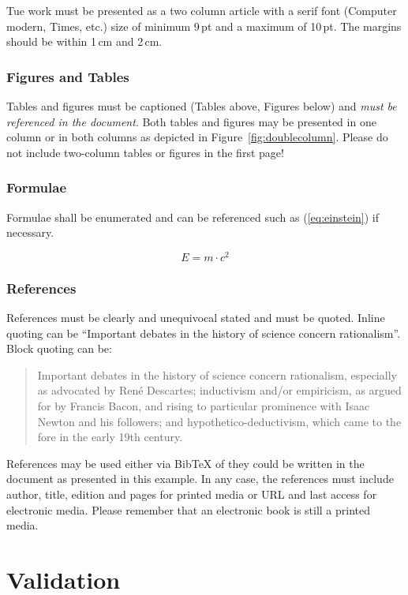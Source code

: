 	Tue work must be presented as a two column article with a serif font (Computer modern, Times, etc.)  size of minimum 9\,pt and a maximum of 10\,pt. The margins should be within 1\,cm and 2\,cm.
	
	\subsubsection{Figures and Tables}
	Tables and figures must be captioned (Tables above, Figures below) and \emph{must be referenced in the document}. Both tables and figures may be presented in one column or in both columns as depicted in Figure~\ref{fig:doublecolumn}. Please do not include two-column tables or figures in the first page!
	

	
	\subsubsection{Formulae}
	Formulae shall be enumerated and can be referenced such as (\ref{eq:einstein}) if necessary.
	
	\begin{equation}
		E=m\cdot c^2 \label{eq:einstein}
	\end{equation}
	
	\subsubsection{References}
	References must be clearly and unequivocal stated and must be quoted. Inline quoting can be ``Important debates in the history of science concern rationalism''\cite{scientificMethod}. Block quoting can be:
	\begin{quotation}
		Important debates in the history of science concern rationalism, especially as advocated by René Descartes; inductivism and/or empiricism, as argued for by Francis Bacon, and rising to particular prominence with Isaac Newton and his followers; and hypothetico-deductivism, which came to the fore in the early 19th century.\cite{scientificMethod}
	\end{quotation}
	
	References may be used either via BibTeX of they could be written in the document as presented in this example. In any case, the references must include author, title, edition and pages for printed media or URL and last access for electronic media. Please remember that an electronic book is still a printed media.
	
	\section{Validation}
	

